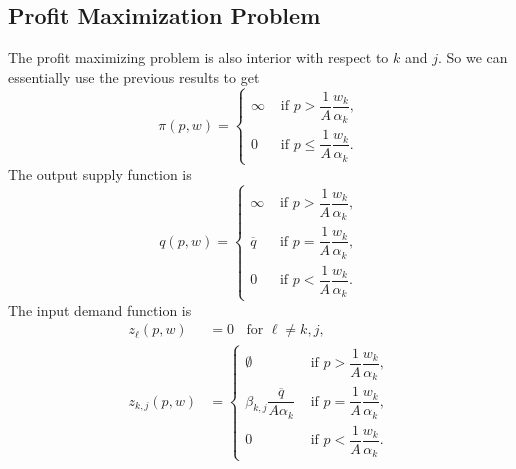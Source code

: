 \documentclass[12pt]{article}
\theoremstyle{definition}
\begin{document}
\subsection{Profit Maximization Problem}

The profit maximizing problem is also interior with respect to $k$ and $j$. So we can essentially use the previous results to get
\[ \pi(p,w)=
\begin{cases}
	\infty		& \text{ if } p >  \dfrac{1}{A} \dfrac{ w_k}{ \alpha_k},\\[2ex]
	0		& \text{ if } p \leq  \dfrac{1}{A} \dfrac{ w_k}{ \alpha_k}.
\end{cases}
\]
The output supply function is
\[ q(p,w)=
\begin{cases}
	\infty		& \text{ if } p >  \dfrac{1}{A} \dfrac{ w_k}{ \alpha_k},\\[2ex]
	\overline{q}		& \text{ if } p =  \dfrac{1}{A} \dfrac{ w_k}{ \alpha_k},\\[2ex]
	0		& \text{ if } p <  \dfrac{1}{A} \dfrac{ w_k}{ \alpha_k}.
\end{cases}
\]
The input demand function is 
\begin{align*}
	z_{\ell}(p,w) &=0	\;\; \text{ for } \ell \neq k,j,\\
	z_{k,j}(p,w) &=
\begin{cases}
	\emptyset		& \text{ if } p >  \dfrac{1}{A} \dfrac{ w_k}{ \alpha_k},\\[2ex]
	 \beta_{k,j} \dfrac{\overline{q}}{A \alpha_k}		& \text{ if } p =  \dfrac{1}{A} \dfrac{ w_k}{ \alpha_k},\\[2ex]
	0		& \text{ if } p <  \dfrac{1}{A} \dfrac{ w_k}{ \alpha_k}.
\end{cases}
\end{align*}




	
\end{document}
